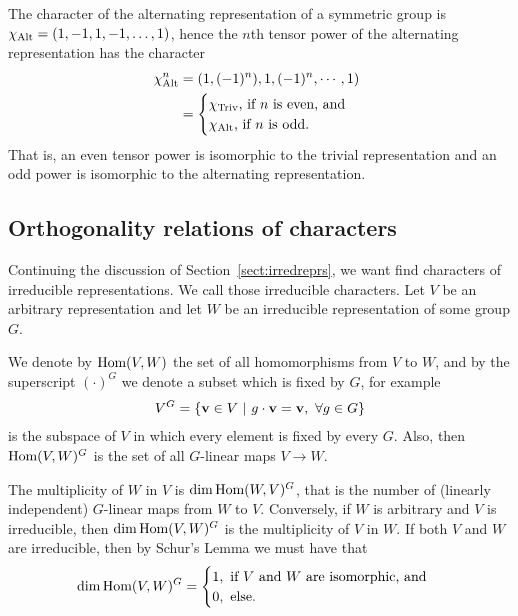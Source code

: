 \begin{example}
	The character of the alternating representation of a symmetric group is $\chi_{\text{Alt}} = (1, -1, 1, -1, \dots, 1)$, hence the $n$th tensor power of the alternating representation has the character
	\begin{align*}
		\chi_{\text{Alt}}^n &= (1, (-1)^n), 1, (-1)^n, \cdots, 1) \\
		&= \begin{cases}
			\chi_{\text{Triv}} \text{, if $n$ is even, and } \\
			\chi_{\text{Alt}} \text{, if $n$ is odd.}
		\end{cases}
	\end{align*}
	That is, an even tensor power is isomorphic to the trivial representation and an odd power is isomorphic to the alternating representation.
\end{example}

\subsection{Orthogonality relations of characters}

Continuing the discussion of Section~\ref{sect:irredreprs}, we want find characters of irreducible representations. We call those irreducible characters. Let $V$ be an arbitrary representation and let $W$ be an irreducible representation of some group $G$. 

We denote by $\text{Hom} (V,W)$ the set of all homomorphisms from $V$ to $W$, and by the superscript $(\cdot) ^G$ we denote a subset which is fixed by $G$, for example 
\begin{align}\label{eq:defVG}
	V^G = \left\lbrace \mathbf{v} \in V \ \middle\vert \ g\cdot \mathbf{v} = \mathbf{v}, \ \forall g \in G \right\rbrace
\end{align} 
is the subspace of $V$ in which every element is fixed by every $G$. Also, then $\text{Hom}(V,W)^G$ is the set of all $G$-linear maps $V \rightarrow W$.

\begin{proposition}
	The multiplicity of $W$ in $V$ is $\dim \text{Hom}(W,V)^G$, that is the number of (linearly independent) $G$-linear maps from $W$ to $V$. Conversely, if $W$ is arbitrary and $V$ is irreducible, then $\dim \text{Hom} (V,W)^G$ is the multiplicity of $V$ in $W$. If both $V$ and $W$ are irreducible, then by Schur's Lemma we must have that
	\begin{align}\label{eq:dimhomVWG}
		\dim \text{Hom} (V,W)^G = \begin{cases}
			1, \text{ if $V$ and $W$ are isomorphic, and} \\
			0, \text{ else.}
		\end{cases}
	\end{align}
\end{proposition}

